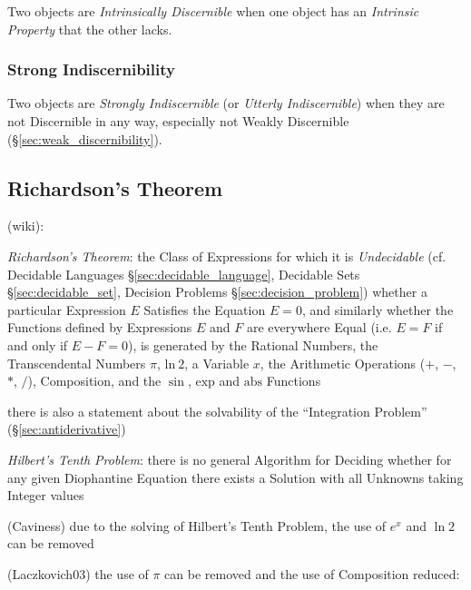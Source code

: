 
Two objects are \emph{Intrinsically Discernible} when one object has
an \emph{Intrinsic Property} that the other lacks.



\subsubsection{Strong Indiscernibility}\label{sec:strong_indiscernibility}

Two objects are \emph{Strongly Indiscernible} (or \emph{Utterly
  Indiscernible}) when they are not Discernible in any way, especially
not Weakly Discernible (\S\ref{sec:weak_discernibility}).



\subsection{Richardson's Theorem}\label{sec:richardsons_theorem}


(wiki):

\emph{Richardson's Theorem}: the Class of Expressions for which it is
\emph{Undecidable} (cf. Decidable Languages \S\ref{sec:decidable_language},
Decidable Sets \S\ref{sec:decidable_set}, Decision Problems
\S\ref{sec:decision_problem}) whether a particular Expression $E$ Satisfies the
Equation $E = 0$, and similarly whether the Functions defined by Expressions
$E$ and $F$ are everywhere Equal (i.e. $E = F$ if and only if $E - F = 0$), is
generated by the Rational Numbers, the Transcendental Numbers $\pi$,
$\mathrm{ln}\ 2$, a Variable $x$, the Arithmetic Operations ($+$, $-$, $*$,
$/$), Composition, and the $\sin$, $\mathrm{exp}$ and $\mathrm{abs}$ Functions

there is also a statement about the solvability of the ``Integration Problem''
(\S\ref{sec:antiderivative})

\emph{Hilbert's Tenth Problem}: there is no general Algorithm for Deciding
whether for any given Diophantine Equation there exists a Solution with all
Unknowns taking Integer values

(Caviness) due to the solving of Hilbert's Tenth Problem, the use of $e^x$ and
$\ln 2$ can be removed

(Laczkovich03) the use of $\pi$ can be removed and the use of Composition
reduced:

